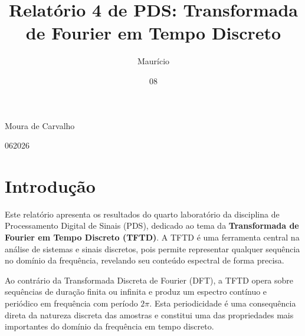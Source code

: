 \documentclass[tcc]{classe_uftex/uftex}
\begin{document}
  \title{Relatório 4 de PDS: Transformada de Fourier em Tempo Discreto}
  \author{Maurício}{Moura de Carvalho}


  \date{08}{06}{2026}



  \maketitle
  \frontmatter

  \tableofcontents

  \mainmatter
  \setcounter{page}{1}
  \onehalfspacing


\chapter{Introdução}

Este relatório apresenta os resultados do quarto laboratório da disciplina de Processamento Digital de Sinais (PDS), dedicado ao tema da \textbf{Transformada de Fourier em Tempo Discreto (TFTD)}. A TFTD é uma ferramenta central na análise de sistemas e sinais discretos, pois permite representar qualquer sequência no domínio da frequência, revelando seu conteúdo espectral de forma precisa.

Ao contrário da Transformada Discreta de Fourier (DFT), a TFTD opera sobre sequências de duração finita ou infinita e produz um espectro contínuo e periódico em frequência com período $2\pi$. Esta periodicidade é uma consequência direta da natureza discreta das amostras e constitui uma das propriedades mais importantes do domínio da frequência em tempo discreto.
\end{document}
